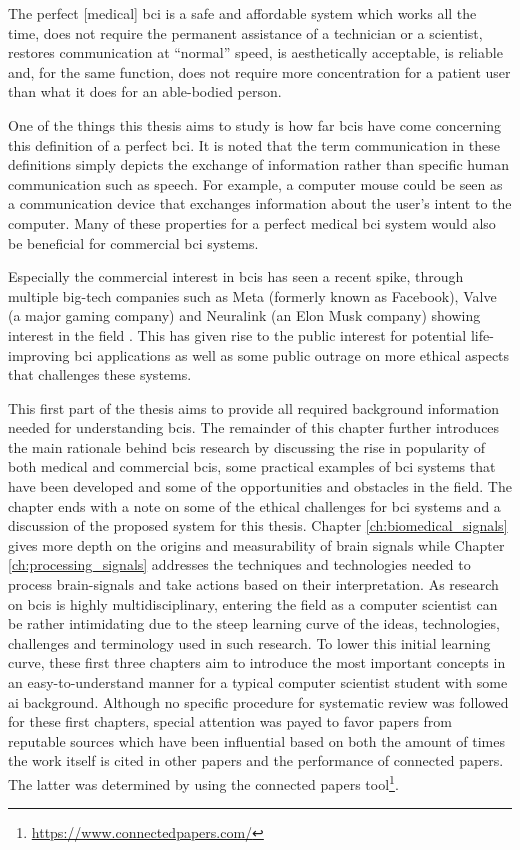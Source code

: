 \setlength{\epigraphwidth}{0.9\textwidth}
\epigraph{The perfect [medical] \gls{bci} is a safe and affordable system which works all the time, does not require the permanent assistance of a technician or a scientist, restores communication at “normal” speed, is aesthetically acceptable, is reliable and, for the same function, does not require more concentration for a patient user than what it does for an able-bodied person.}{\textit{\citet{bci_book, cheap_bci_feasibility}}}


One of the things this thesis aims to study is how far \glspl{bci} have come concerning this definition of a perfect \gls{bci}.
It is noted that the term communication in these definitions simply depicts the exchange of information rather than specific human communication such as speech. For example, a computer mouse could be seen as a communication device that exchanges information about the user's intent to the computer.
Many of these properties for a perfect medical \gls{bci} system would also be beneficial for commercial \gls{bci} systems.

Especially the commercial interest in \glspl{bci} has seen a recent spike, through multiple big-tech companies such as Meta (formerly known as Facebook), Valve (a major gaming company) and Neuralink (an Elon Musk company) showing interest in the field \citep{facebook_bci_blog, bci_valve, neuralink_whitepaper}.
This has given rise to the public interest for potential life-improving \gls{bci} applications as well as some public outrage on more ethical aspects that challenges these systems. 

This first part of the thesis aims to provide all required background information needed for understanding \glspl{bci}.
The remainder of this chapter further introduces the main rationale behind \glspl{bci} research by discussing the rise in popularity of both medical and commercial \glspl{bci}, some practical examples of \gls{bci} systems that have been developed and some of the opportunities and obstacles in the field. The chapter ends with a note on some of the ethical challenges for \gls{bci} systems and a discussion of the proposed system for this thesis.
Chapter \ref{ch:biomedical_signals} gives more depth on the origins and measurability of brain signals while Chapter \ref{ch:processing_signals} addresses the techniques and technologies needed to process brain-signals and take actions based on their interpretation. 
As research on \glspl{bci} is highly multidisciplinary, entering the field as a computer scientist can be rather intimidating due to the steep learning curve of the ideas, technologies, challenges and terminology used in such research.
To lower this initial learning curve, these first three chapters aim to introduce the most important concepts in an easy-to-understand manner for a typical computer scientist student with some \gls{ai} background.
Although no specific procedure for systematic review was followed for these first chapters, special attention was payed to favor papers from reputable sources which have been influential based on both the amount of times the work itself is cited in other papers and the performance of connected papers.
The latter was determined by using the connected papers tool\footnote{\url{https://www.connectedpapers.com/}}.

